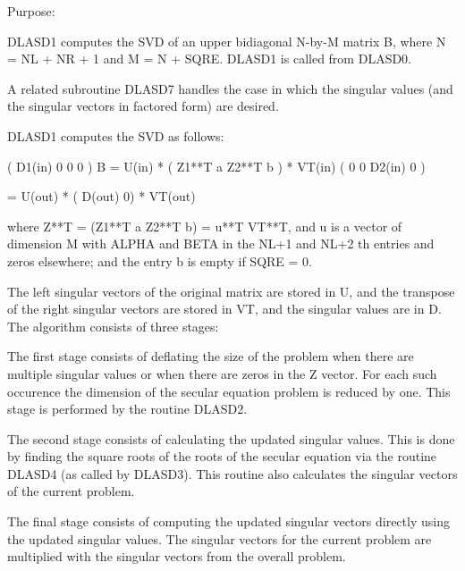  \begin{DoxyParagraph}{Purpose\+: }
\begin{DoxyVerb} DLASD1 computes the SVD of an upper bidiagonal N-by-M matrix B,
 where N = NL + NR + 1 and M = N + SQRE. DLASD1 is called from DLASD0.

 A related subroutine DLASD7 handles the case in which the singular
 values (and the singular vectors in factored form) are desired.

 DLASD1 computes the SVD as follows:

               ( D1(in)    0    0       0 )
   B = U(in) * (   Z1**T   a   Z2**T    b ) * VT(in)
               (   0       0   D2(in)   0 )

     = U(out) * ( D(out) 0) * VT(out)

 where Z**T = (Z1**T a Z2**T b) = u**T VT**T, and u is a vector of dimension M
 with ALPHA and BETA in the NL+1 and NL+2 th entries and zeros
 elsewhere; and the entry b is empty if SQRE = 0.

 The left singular vectors of the original matrix are stored in U, and
 the transpose of the right singular vectors are stored in VT, and the
 singular values are in D.  The algorithm consists of three stages:

    The first stage consists of deflating the size of the problem
    when there are multiple singular values or when there are zeros in
    the Z vector.  For each such occurence the dimension of the
    secular equation problem is reduced by one.  This stage is
    performed by the routine DLASD2.

    The second stage consists of calculating the updated
    singular values. This is done by finding the square roots of the
    roots of the secular equation via the routine DLASD4 (as called
    by DLASD3). This routine also calculates the singular vectors of
    the current problem.

    The final stage consists of computing the updated singular vectors
    directly using the updated singular values.  The singular vectors
    for the current problem are multiplied with the singular vectors
    from the overall problem.\end{DoxyVerb}
 
\end{DoxyParagraph}

